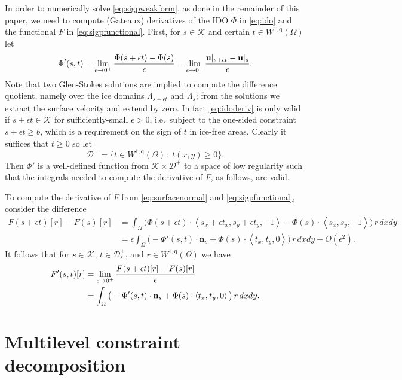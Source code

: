 \documentclass[letterpaper,final,12pt,reqno]{amsart}
\theoremstyle{claim}
\newcommand{\eps}{\epsilon}
\newcommand{\bn}{\mathbf{n}}
\newcommand{\bu}{\mathbf{u}}
\newcommand{\qq}{{\text{q}}}
\numberwithin{equation}{section}
\numberwithin{figure}{section}
\numberwithin{table}{section}
\numberwithin{theorem}{section}
\begin{document}
In order to numerically solve \eqref{eq:sigpweakform}, as done in the remainder of this paper, we need to compute (Gateaux) derivatives of the IDO $\Phi$ in \eqref{eq:ido} and the functional $F$ in \eqref{eq:sigpfunctional}.  First, for $s \in \mathcal{K}$ and certain $t \in W^{1,\qq}(\Omega)$ let
\begin{equation}
\Phi'(s,t) = \lim_{\eps\to 0^+} \frac{\Phi(s+\eps t) - \Phi(s)}{\eps} = \lim_{\eps\to 0^+} \frac{\bu|_{s+\eps t} - \bus}{\eps}. \label{eq:idoderiv}
\end{equation}
Note that two Glen-Stokes solutions are implied to compute the difference quotient, namely over the ice domains $\Lambda_{s+\eps t}$ and $\Lambda_s$; from the solutions we extract the surface velocity and extend by zero.  In fact \eqref{eq:idoderiv} is only valid if $s+\eps t \in \mathcal{K}$ for sufficiently-small $\eps>0$, i.e.~subject to the one-sided constraint $s+\eps t \ge b$, which is a requirement on the sign of $t$ in ice-free areas.  Clearly it suffices that $t \ge 0$ so let
\begin{equation}
\mathcal{D}^+ = \{t \in W^{1,\qq}(\Omega) \,:\, t(x,y) \ge 0\}. \label{eq:infdefectset}
\end{equation}
Then $\Phi'$ is a well-defined function from $\mathcal{K} \times \mathcal{D}^+$ to a space of low regularity such that the integrals needed to compute the derivative of $F$, as follows, are valid.

To compute the derivative of $F$ from \eqref{eq:surfacenormal} and \eqref{eq:sigpfunctional}, consider the difference
\begin{align*}
F(s+\eps t)[r] - F(s)[r] &= \int_\Omega \Big(\Phi(s+\eps t) \cdot \left<s_x+\eps t_x,s_y+\eps t_y,-1\right> - \Phi(s) \cdot \left<s_x,s_y,-1\right>\Big)\, r \,dx dy \\
    &= \eps \int_\Omega \big(-\Phi'(s,t) \cdot \bn_s + \Phi(s) \cdot \left<t_x,t_y,0\right>\big)\, r \,dx dy + O(\eps^2).
\end{align*}
It follows that for $s\in \mathcal{K}$, $t\in \mathcal{D}_s^+$, and $r \in W^{1,\qq}(\Omega)$ we have
\begin{align}
F'(s,t)[r] &= \lim_{\eps\to 0^+} \frac{F(s+\eps t)[r] - F(s)[r]}{\eps}  \label{eq:sigpfunctionalderiv} \\
    &= \int_\Omega \big(-\Phi'(s,t) \cdot \bn_s + \Phi(s) \cdot \left<t_x,t_y,0\right>\big)\, r \,dx dy. \notag
\end{align}


\section{Multilevel constraint decomposition} \label{sec:mcdstokes}
\end{document}
